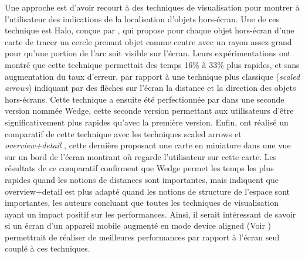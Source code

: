 Une approche est d'avoir recourt à des techniques de visualisation pour montrer à l'utilisateur des indications de la localisation d'objets hors-écran. Une de ces technique est Halo, conçue par \citet{BaudischRosenholtz2003}, qui propose pour chaque objet hors-écran d'une carte de tracer un cercle prenant objet comme centre avec un rayon assez grand pour qu'une portion de l'arc soit visible sur l'écran. Leurs expérimentations ont montré que cette technique permettait des temps 16\% à 33\% plus rapides, et sans augmentation du taux d'erreur, par rapport à une technique plus classique (\emph{scaled arrows}) indiquant par des flèches sur l'écran la distance et la direction des objets hors-écrans. Cette technique a ensuite été perfectionnée par \citet{GustafsonBaudischGutwinEtAl2008} dans une seconde version nommée Wedge, cette seconde version permettant aux utilisateurs d'être significativement plus rapides qu'avec la première version. Enfin, \citet{BurigatChittaro2011} ont réalisé un comparatif de cette technique avec les techniques \foreignlanguage{english}{scaled arrows} et \emph{overview+detail} , cette dernière proposant une carte en miniature dans une vue sur un bord de l'écran montrant où regarde l'utilisateur sur cette carte. Les résultats de ce comparatif confirment que Wedge permet les temps les plus rapides quand les notions de distances sont importantes, mais indiquent que overview+detail est plus adapté quand les notions de structure de l'espace sont importantes, les auteurs concluant que toutes les techniques de visualisation ayant un impact positif sur les performances. Ainsi, il serait intéressant de savoir si un écran d'un appareil mobile augmenté en mode \foreignlanguage{english}{device aligned} (Voir \cite{GrubertKranzQuigley2015}) permettrait de réaliser de meilleures performances par rapport à l'écran seul couplé à ces techniques.





